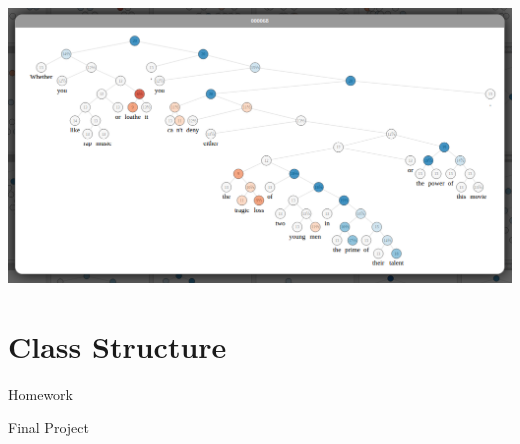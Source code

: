 \documentclass{beamer}
\begin{document}
\begin{frame}
  \begin{center}
    \includegraphics[width=\textwidth]{sentiment}
  \end{center}
\end{frame}


\section{Class Structure}

\begin{frame}
  
\end{frame}

\begin{frame}{Homework}
  
\end{frame}


\begin{frame}{Final Project}
  
\end{frame}
\end{document}
